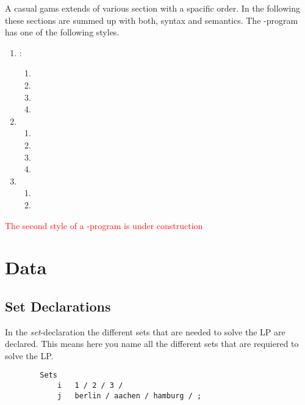 \documentclass[10pt]{article}
\title{\text{\asciifamily GAMS-Programming}}
\begin{document}
\maketitle


  A casual gams extends of various section with a spacific order. In the
  following these sections are summed up with both, syntax and semantics.
  The -program has one of the following styles.

  \begin{enumerate}
    \item {}:
    \begin{enumerate}
      \item {}
      \item {}
      \item {}
      \item {}
    \end{enumerate}
    \item {}
    \begin{enumerate}
      \item {}
      \item {}
      \item {}
      \item {}
    \end{enumerate}
    \item {}
    \begin{enumerate}
      \item {}
      \item {}
    \end{enumerate}
  \end{enumerate}
  


  \textcolor{red}{The second style of a -program is under
    construction}



  \section{Data}
  \label{data}
    \subsection{Set Declarations}
    \label{data:declarations}
      In the \emph{set}-declaration the different sets that are needed to solve
      the LP are declared. This means here you name all the different sets that
      are requiered to solve the LP. 
      \begin{lstlisting}
        Sets
            i   1 / 2 / 3 /
            j   berlin / aachen / hamburg / ;
      \end{lstlisting}
\end{document}
